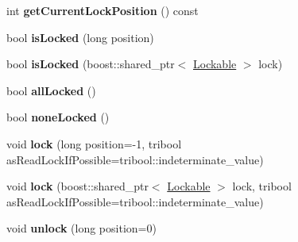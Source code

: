 \begin{DoxyCompactItemize}
\item 
\hypertarget{classcore_1_1threading_1_1_resource_locker_a9d4ef138ebf407381a6d7cc40af4b523}{int {\bfseries get\-Current\-Lock\-Position} () const }\label{classcore_1_1threading_1_1_resource_locker_a9d4ef138ebf407381a6d7cc40af4b523}

\item 
\hypertarget{classcore_1_1threading_1_1_resource_locker_ae18476af96f344df61a40e306db75ae8}{bool {\bfseries is\-Locked} (long position)}\label{classcore_1_1threading_1_1_resource_locker_ae18476af96f344df61a40e306db75ae8}

\item 
\hypertarget{classcore_1_1threading_1_1_resource_locker_a6a166b10c93cba313837f760cd41a969}{bool {\bfseries is\-Locked} (boost\-::shared\-\_\-ptr$<$ \hyperlink{classcore_1_1threading_1_1_lockable}{Lockable} $>$ lock)}\label{classcore_1_1threading_1_1_resource_locker_a6a166b10c93cba313837f760cd41a969}

\item 
\hypertarget{classcore_1_1threading_1_1_resource_locker_a269c4a880b48a768c3d9748f02d1e940}{bool {\bfseries all\-Locked} ()}\label{classcore_1_1threading_1_1_resource_locker_a269c4a880b48a768c3d9748f02d1e940}

\item 
\hypertarget{classcore_1_1threading_1_1_resource_locker_a0153850743757bdb6fa875856764ffed}{bool {\bfseries none\-Locked} ()}\label{classcore_1_1threading_1_1_resource_locker_a0153850743757bdb6fa875856764ffed}

\item 
\hypertarget{classcore_1_1threading_1_1_resource_locker_a59411ae3e38b757af9cf6ba40fcaf543}{void {\bfseries lock} (long position=-\/1, tribool as\-Read\-Lock\-If\-Possible=tribool\-::indeterminate\-\_\-value)}\label{classcore_1_1threading_1_1_resource_locker_a59411ae3e38b757af9cf6ba40fcaf543}

\item 
\hypertarget{classcore_1_1threading_1_1_resource_locker_a35f2abef8afa49dd6f90e8754e132f6b}{void {\bfseries lock} (boost\-::shared\-\_\-ptr$<$ \hyperlink{classcore_1_1threading_1_1_lockable}{Lockable} $>$ lock, tribool as\-Read\-Lock\-If\-Possible=tribool\-::indeterminate\-\_\-value)}\label{classcore_1_1threading_1_1_resource_locker_a35f2abef8afa49dd6f90e8754e132f6b}

\item 
\hypertarget{classcore_1_1threading_1_1_resource_locker_a74516cb932cf997e7350081970697500}{void {\bfseries unlock} (long position=0)}\label{classcore_1_1threading_1_1_resource_locker_a74516cb932cf997e7350081970697500}


\end{DoxyCompactItemize}

